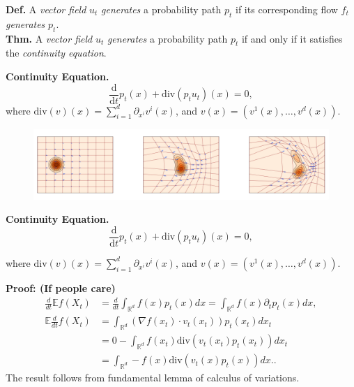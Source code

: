 \documentclass{beamer}
\begin{document}
\begin{frame}
    \textbf{Def.} A \emph{vector field} \( u_t \) \emph{generates} a probability path \( p_t \) if its corresponding flow \( f_t \) \emph{generates} \( p_t \). \\
    \vskip 5pt
    \textbf{Thm.} A \emph{vector field} \( u_t \) \emph{generates} a probability path \( p_t \) if and only if it satisfies the \emph{continuity equation}.
    \begin{blackblock}
    \textbf{Continuity Equation.}
    \[ \frac{\mathrm{d}}{\mathrm{d}t}p_t(x) + \mathrm{div}(p_t u_t)(x) = 0, \]
    where $\text{div}(v)(x) = \sum_{i=1}^{d} \partial_{x^{i}} v^{i}(x)$, and $v(x) = (v^{1}(x), \ldots, v^{d}(x))$.
    \end{blackblock}
    \begin{figure}
        \centering
        \includegraphics[width=\linewidth]{figures/density-vis.png}
    \end{figure}
\end{frame}
\begin{frame}
    \begin{blackblock}
    \textbf{Continuity Equation.}
    \[ \frac{\mathrm{d}}{\mathrm{d}t}p_t(x) + \mathrm{div}(p_t u_t)(x) = 0, \]

    where $\text{div}(v)(x) = \sum_{i=1}^{d} \partial_{x^{i}} v^{i}(x)$, and $v(x) = (v^{1}(x), \ldots, v^{d}(x))$.
    \end{blackblock}
    \textbf{Proof: (If people care)}
    \begin{align*}
        \frac{d}{dt}\mathbb{E}f(X_t) &= \frac{d}{dt}\int_{\mathbb{R}^d} f(x)p_t(x)dx = \int_{\mathbb{R}^d} f(x)\partial_t p_t(x)dx, \\
     \mathbb{E}\frac{d}{dt}f(X_t) &= \int_{\mathbb{R}^d} \left(\nabla f(x_t)\cdot v_t(x_t)\right) p_t(x_t)dx_t \\  
                                  &= 0 - \int_{\mathbb{R}^d} f(x_t)\text{div}(v_t(x_t)p_t(x_t))dx_t \tag*{(IBP)}\\ 
                                  &= \int_{\mathbb{R}^d} -f(x)\text{div}(v_t(x)p_t(x))dx.
    .\end{align*}
    The result follows from fundamental lemma of calculus of variations.

\end{frame}
\end{document}
